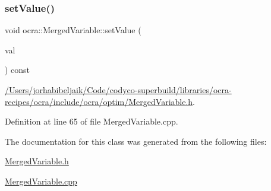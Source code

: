 \hypertarget{classocra_1_1MergedVariable_a2c53faf60a0aa267457aa6688b7341aa}{}\label{classocra_1_1MergedVariable_a2c53faf60a0aa267457aa6688b7341aa} 
\subsubsection{\texorpdfstring{set\+Value()}{setValue()}}
{\footnotesize\ttfamily void ocra\+::\+Merged\+Variable\+::set\+Value (\begin{DoxyParamCaption}\item[{const Vector\+Xd \&}]{val }\end{DoxyParamCaption}) const}

\begin{Desc}
\item[Examples\+: ]\par
\hyperlink{_2Users_2jorhabibeljaik_2Code_2codyco-superbuild_2libraries_2ocra-recipes_2ocra_2include_2ocra_27dfe52ed2d2fe1904154f5be9150e8b1}{/\+Users/jorhabibeljaik/\+Code/codyco-\/superbuild/libraries/ocra-\/recipes/ocra/include/ocra/optim/\+Merged\+Variable.\+h}.\end{Desc}


Definition at line 65 of file Merged\+Variable.\+cpp.



The documentation for this class was generated from the following files\+:\begin{DoxyCompactItemize}
\item 
\hyperlink{MergedVariable_8h}{Merged\+Variable.\+h}\item 
\hyperlink{MergedVariable_8cpp}{Merged\+Variable.\+cpp}\end{DoxyCompactItemize}
